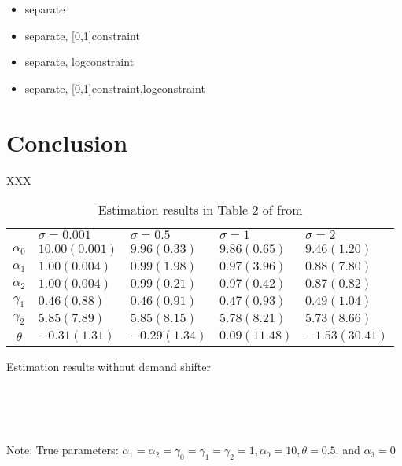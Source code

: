 \documentclass[11pt, a4paper]{article}
\begin{document}
\begin{itemize}
    \item separate
    \item separate, [0,1]constraint
    \item separate, logconstraint
    \item separate, [0,1]constraint,logconstraint
\end{itemize}

    
\section{Conclusion}

XXX

\appendix


\begin{table}[!htbp]
    \centering
    \caption{Estimation results in Table 2 of from \cite{perloff2012collinearity}}
    \label{tb:linear_linear_sigma_Perloff_Shen} 
        \begin{tabular}{cllll}
            \hline\hline
            & $\sigma=0.001$ & $\sigma=0.5$ & $\sigma=1$ & $\sigma=2$ \\
            $\alpha_0$ & $10.00(0.001)$ & $9.96(0.33)$ & $9.86(0.65)$ & $9.46(1.20)$ \\
            $\alpha_1$ & $1.00(0.004)$ & $0.99(1.98)$ & $0.97(3.96)$ & $0.88(7.80)$ \\
            $\alpha_2$ & $1.00(0.004)$ & $0.99(0.21)$ & $0.97(0.42)$ & $0.87(0.82)$ \\
            $\gamma_1$ & $0.46(0.88)$ & $0.46(0.91)$ & $0.47(0.93)$ & $0.49(1.04)$ \\
            $\gamma_2$ & $5.85(7.89)$ & $5.85(8.15)$ & $5.78(8.21)$ & $5.73(8.66)$ \\
            $\theta$ & $-0.31(1.31)$ & $-0.29(1.34)$ & $0.09(11.48)$ & $-1.53(30.41)$ \\
            \hline
        \end{tabular}
\end{table}


\begin{table}[!htbp]
  \begin{center}
      \caption{Estimation results without demand shifter}
      \label{tb:linear_linear_sigma_1_without_demand_shifter_y} 
      \subfloat[$\sigma=0.001$]{}\\
      \subfloat[$\sigma=0.5$]{}\\
      \subfloat[$\sigma=1.0$]{}\\
    \subfloat[$\sigma=2.0$]{}
  \end{center}\footnotesize
  Note: True parameters: $\alpha_1 = \alpha_2 =  \gamma_0 = \gamma_1 = \gamma_2  =  1, \alpha_0 = 10, \theta = 0.5.$ and $\alpha_3 =0$
\end{table} 
\end{document}
